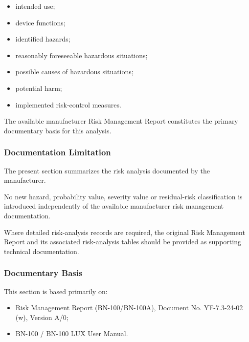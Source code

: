 \begin{itemize}

    \item intended use;

    \item device functions;

    \item identified hazards;

    \item reasonably foreseeable hazardous situations;

    \item possible causes of hazardous situations;

    \item potential harm;

    \item implemented risk-control measures.

\end{itemize}

The available manufacturer Risk Management Report constitutes the primary
documentary basis for this analysis.

\subsubsection{Documentation Limitation}

The present section summarizes the risk analysis documented by the
manufacturer.

No new hazard, probability value, severity value or residual-risk
classification is introduced independently of the available manufacturer
risk management documentation.

Where detailed risk-analysis records are required, the original Risk
Management Report and its associated risk-analysis tables should be
provided as supporting technical documentation.

\subsubsection{Documentary Basis}

This section is based primarily on:

\begin{itemize}

    \item Risk Management Report (BN-100/BN-100A), Document No.
    YF-7.3-24-02 (w), Version A/0;

    \item BN-100 / BN-100 LUX User Manual.

\end{itemize}
